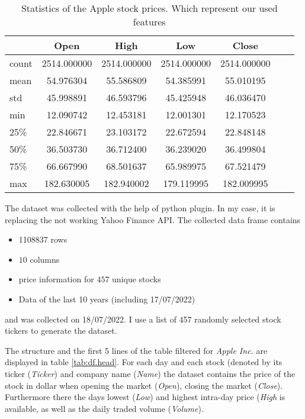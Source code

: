 \documentclass[fleqn,10pt]{SelfArx} %
\begin{document}
\begin{table*}[hbt]
	\caption{Statistics of the Apple stock prices. Which represent our used features}
	\centering
\begin{tabular}{lS[table-auto-round,table-format=9.1] S[table-auto-round,table-format=9.1] S[table-auto-round,table-format=9.1] S[table-auto-round,table-format=9.1]S[table-auto-round,scientific-notation = engineering, table-format=-1.1e-1]  S[table-auto-round,table-format=9.0]}
\toprule
{} &         {Open} &         {High} &          {Low}&        {Close}              \\
\midrule
count &  2514.000000 &  2514.000000 &  2514.000000 &  2514.000000  \\
mean  &    54.976304 &    55.586809 &    54.385991 &    55.010195 \\
std   &    45.998891 &    46.593796 &    45.425948 &    46.036470  \\
min   &    12.090742 &    12.453181 &    12.001301 &    12.170523  \\
25\%   &    22.846671 &    23.103172 &    22.672594 &    22.848148 \\
50\%   &    36.503730 &    36.712400 &    36.239020 &    36.499804  \\
75\%   &    66.667990 &    68.501637 &    65.989975 &    67.521479  \\
max   &   182.630005 &   182.940002 &   179.119995 &   182.009995  \\
\bottomrule
\end{tabular}
	\label{tab:df.statistrics}
\end{table*}


The dataset was collected with the help of  python plugin. In my case, it is replacing the not working Yahoo Finance API. The collected data frame contains
\begin{itemize}[noitemsep] %
	\item \num{1108837} rows
	\item $10$ columns
	\item price information for $457$ unique stocks
	\item Data of the last 10 years (including 17/07/2022)
\end{itemize} and was collected on 18/07/2022. I use a list of 457 randomly selected stock tickers to generate the dataset. 

The structure and the first 5 lines of the table filtered for \textit{Apple Inc.} are displayed in table \ref{tab:df.head}. For each day and each stock (denoted by its ticker (\textit{Ticker}) and company name (\textit{Name}) the dataset contains the price of the stock in dollar 
when opening the market (\textit{Open}), closing the market (\textit{Close}). Furthermore there the days lowest (\textit{Low}) and highest 
intra-day price (\textit{High} is available, as well as the daily traded volume (\textit{Volume}).
\end{document}
